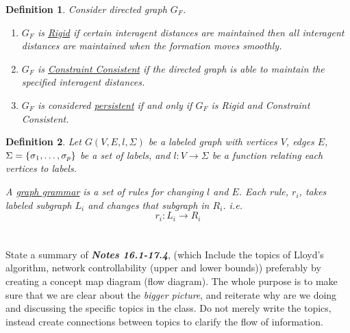 \documentclass[]{article}
\numberwithin{equation}{section}
\newtheorem{definition}{Definition}
\begin{document}


\begin{definition} \label{def:persistent}
    Consider directed graph $G_F$. 
    \begin{enumerate}
        \item $G_F$ is \emph{\underline{Rigid}} if certain interagent distances are maintained then all interagent distances are maintained when the formation moves smoothly.
        \item $G_F$ is \emph{\underline{Constraint Consistent}} if the directed graph is able to maintain the specified interagent distances.
        \item $G_F$ is considered \emph{\underline{persistent}} if and only if $G_F$ is Rigid and Constraint Consistent.
    \end{enumerate}
\end{definition}

\begin{definition}
    Let $G(V,E, l, \Sigma)$ be a labeled graph with vertices $V$, edges $E$, $\Sigma = \qty{\sigma_1, \dots, \sigma_p}$ be a set of labels, and $l : V \to \Sigma$ be a function relating each vertices to labels.

    A \emph{\underline{graph grammar}} is a set of rules for changing $l$ and $E$. 
    Each rule, $r_i$, takes labeled subgraph $L_i$ and changes that subgraph in $R_i$. 
    i.e. \[
        r_i : L_i \longrightarrow R_i
    \]
\end{definition}




\newpage
\section{}
State a summary of \emph{\textbf{Notes 16.1-17.4}}, (which Include the topics of Lloyd's algorithm, network controllability (upper and lower bounds)) preferably by creating a concept map diagram (flow diagram). 
The whole purpose is to make sure that we are clear about the \emph{bigger picture}, and reiterate why are we doing and discussing the specific topics in the class. 
Do not merely write the topics, instead create connections between topics to clarify the flow of information.
\end{document}
